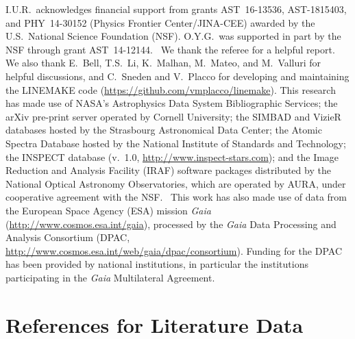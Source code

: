 \documentclass[twocolumn,tighten]{aastex62}
\begin{document}
\acknowledgments

I.U.R.\ acknowledges financial support from
grants AST~16-13536, AST-1815403,
and PHY~14-30152 (Physics Frontier Center/JINA-CEE)
awarded by the U.S.\ National Science Foundation (NSF).
O.Y.G.\ was supported in part by the NSF through grant AST~14-12144.~
We thank the referee for a helpful report.
We also thank
E.~Bell, T.S.\ Li, K.~Malhan, M.~Mateo, and M.~Valluri
for helpful discussions, and
C.\ Sneden and V.\ Placco for
developing and maintaining the LINEMAKE code
(\url{https://github.com/vmplacco/linemake}).
This research has made use of NASA's
Astrophysics Data System Bibliographic Services;
the arXiv pre-print server operated by Cornell University;
the SIMBAD and VizieR databases hosted by the
Strasbourg Astronomical Data Center;
the Atomic Spectra Database hosted by %
the National Institute of Standards and Technology;
the INSPECT database
(v.\ 1.0, \url{http://www.inspect-stars.com});
and
the Image Reduction and Analysis Facility (IRAF) software packages
distributed by the National Optical Astronomy Observatories,
which are operated by AURA,
under cooperative agreement with the NSF.~
This work has also made use of data from the European Space Agency (ESA)
mission {\it Gaia} 
(\url{http://www.cosmos.esa.int/gaia}), 
processed by the {\it Gaia} Data Processing and Analysis Consortium (DPAC,
\url{http://www.cosmos.esa.int/web/gaia/dpac/consortium}). 
Funding for the DPAC has been provided by national institutions, in particular
the institutions participating in the {\it Gaia} Multilateral Agreement.




\appendix
\section{References for Literature Data}
\label{litappendix}
\end{document}
